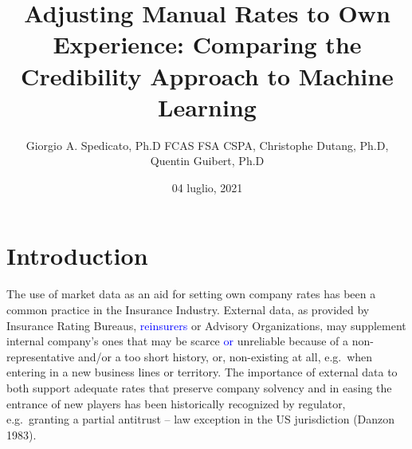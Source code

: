 \documentclass[
]{article}
\title{Adjusting Manual Rates to Own Experience: Comparing the
Credibility Approach to Machine Learning}
\author{Giorgio A. Spedicato, Ph.D FCAS FSA CSPA, Christophe Dutang,
Ph.D, Quentin Guibert, Ph.D}
\date{04 luglio, 2021}
\begin{document}
\maketitle

\hypertarget{introduction}{%
\section{Introduction}\label{introduction}}

The use of market data as an aid for setting own company rates has been
a common practice in the Insurance Industry. External data, as provided
by Insurance Rating Bureaus, \textcolor{blue}{reinsurers} or Advisory
Organizations, may supplement internal company's ones that may be scarce
\textcolor{blue}{or} unreliable because of a non-representative and/or a
too short history, or, non-existing at all, e.g.~when entering in a new
business lines or territory. The importance of external data to both
support adequate rates that preserve company solvency and in easing the
entrance of new players has been historically recognized by regulator,
e.g.~granting a partial antitrust -- law exception in the US
jurisdiction (Danzon 1983).
\end{document}
